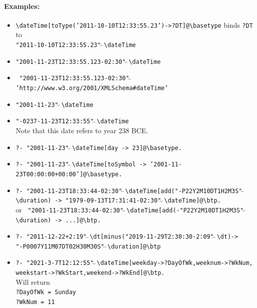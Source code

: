 \documentclass[11pt]{article}
\newcommand{\bs}{\textbackslash}
\begin{document}
\paragraph{Examples:}
\begin{itemize}
\item
  \texttt{\bs{}dateTime[toType('2011-10-10T12:33:55.23')->?DT]@\bs{}basetype}
  binds \texttt{?DT} to\\
  \texttt{"2011-10-10T12:33:55.23"$\hat{~}\hat{~}$\bs{}dateTime}   
\item {\tt "2001-11-23T12:33:55.123-02:30"$\hat{~}\hat{~}$\bs{}dateTime} 
\item
  {\tt
    "2001-11-23T12:33:55.123-02:30"$\hat{~}\hat{~}$'http://www.w3.org/2001/XMLSchema\#dateTime'} 
\item {\tt "2001-11-23"$\hat{~}\hat{~}$\bs{}dateTime}  
\item {\tt "-0237-11-23T12:33:55"$\hat{~}\hat{~}$\bs{}dateTime}\\ 
  Note that this date refers to year 238 BCE.
\item {\tt ?- "2001-11-23"$\hat{~}\hat{~}$\bs{}dateTime[day -> 23]@\bs{}basetype.}  
\item {\tt ?- "2001-11-23"$\hat{~}\hat{~}$\bs{}dateTime[toSymbol ->
    '2001-11-23T00:00:00+00:00']@\bs{}basetype.}  
\item {\tt ?- "2001-11-23T18:33:44-02:30"$\hat{~}\hat{~}$\bs{}dateTime[add("-P22Y2M10DT1H2M3S"$\hat{~}\hat{~}$\bs{}duration)
    -> "1979-09-13T17:31:41-02:30"$\hat{~}\hat{~}$\bs{}dateTime]@\bs{}btp.}
  \\
  or {\tt 
    "2001-11-23T18:33:44-02:30"$\hat{~}\hat{~}$\bs{}dateTime[add(-"P22Y2M10DT1H2M3S"$\hat{~}\hat{~}$\bs{}duration) -> ...]@\bs{}btp.}
\item \texttt{?- "2011-12-22+2:19"$\hat{~}\hat{~}$\bs{}dt[minus("2019-11-29T2:30:30-2:09"$\hat{~}\hat{~}$\bs{}dt)->}
  \\
  \hspace*{5cm}\texttt{"-P0007Y11M07DT02H30M30S"$\hat{~}\hat{~}$\bs{}duration]@\bs{}btp}
  \item \texttt{?-
      "2021-3-7T12:12:55"$\hat{~}\hat{~}$\bs{}dateTime[weekday->?DayOfWk,weeknum->?WkNum,\\
      \hspace*{5.5cm}weekstart->?WkStart,weekend->?WkEnd]@\bs{}btp.}
    \\
    Will return\\
    \verb|?DayOfWk = Sunday|\\
    \verb|?WkNum = 11|\\

\end{itemize}
\end{document}

